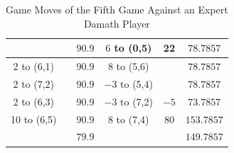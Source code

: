 \begin{appendices}
\begin{table}[H]
\begin{tabular}{cccccc}
                      &    &  $90.9$  & $6$ to (0,5)      & 22  &  $78.7857$    \\ \hline
          2 to (6,1) &    &  $90.9$  & $8$ to (5,6)      &   &  $78.7857$    \\ \hline
          2 to (7,2) &    &  $90.9$  & $-3$ to (5,4)      &   &  $78.7857$    \\ \hline
          2 to (6,3) &    &  $90.9$  & $-3$ to (7,2)      & $-5$   &  $73.7857$    \\ \hline
          10 to (6,5) &    &  $90.9$  & $8$ to (7,4)      & $80$   &  $153.7857$    \\ \hline\hline
                      &    &  $79.9$  &                   &        &  $149.7857$    \\ \hline
    \end{tabular}
    \caption{Game Moves of the Fifth Game Against an Expert Damath Player}
    \label{tab:fifth-game}
\end{table}


\end{appendices}
